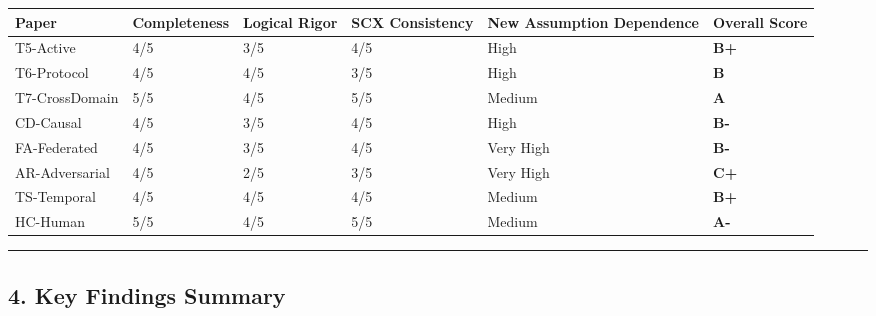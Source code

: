 \documentclass[
  12pt,
]{article}
\begin{document}
\begin{longtable}[]{@{}llllll@{}}
\toprule\noalign{}
Paper & Completeness & Logical Rigor & SCX Consistency & New Assumption Dependence & Overall Score \\
\midrule\noalign{}
\endhead
\bottomrule\noalign{}
\endlastfoot
T5-Active & 4/5 & 3/5 & 4/5 & High & \textbf{B+} \\
T6-Protocol & 4/5 & 4/5 & 3/5 & High & \textbf{B} \\
T7-CrossDomain & 5/5 & 4/5 & 5/5 & Medium & \textbf{A} \\
CD-Causal & 4/5 & 3/5 & 4/5 & High & \textbf{B-} \\
FA-Federated & 4/5 & 3/5 & 4/5 & Very High & \textbf{B-} \\
AR-Adversarial & 4/5 & 2/5 & 3/5 & Very High & \textbf{C+} \\
TS-Temporal & 4/5 & 4/5 & 4/5 & Medium & \textbf{B+} \\
HC-Human & 5/5 & 4/5 & 5/5 & Medium & \textbf{A-} \\
\end{longtable}

\begin{center}\rule{0.5\linewidth}{0.5pt}\end{center}

\subsection{4. Key Findings Summary}\label{key-findings-summary}
\end{document}
